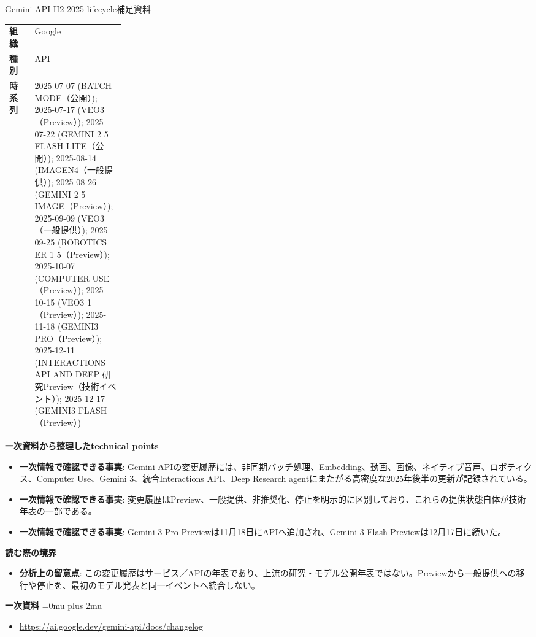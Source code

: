 \begin{technicalnote}{Gemini API H2 2025 lifecycle}{補足資料}
\begingroup
\begin{tabularx}{\linewidth}{@{}>{\bfseries}p{0.22\linewidth}X@{}}
組織 & Google \\
種別 & API \\
時系列 & 2025-07-07 (BATCH MODE（公開）); 2025-07-17 (VEO3（Preview）); 2025-07-22 (GEMINI 2 5 FLASH LITE（公開）); 2025-08-14 (IMAGEN4（一般提供）); 2025-08-26 (GEMINI 2 5 IMAGE（Preview）); 2025-09-09 (VEO3（一般提供）); 2025-09-25 (ROBOTICS ER 1 5（Preview）); 2025-10-07 (COMPUTER USE（Preview）); 2025-10-15 (VEO3 1（Preview）); 2025-11-18 (GEMINI3 PRO（Preview）); 2025-12-11 (INTERACTIONS API AND DEEP 研究Preview（技術イベント）); 2025-12-17 (GEMINI3 FLASH（Preview）) \\
\end{tabularx}
\smallskip
{\bfseries 一次資料から整理したtechnical points}
\begin{itemize}[leftmargin=1.5em,itemsep=0.35em]
\item \textbf{一次情報で確認できる事実}: Gemini APIの変更履歴には、非同期バッチ処理、Embedding、動画、画像、ネイティブ音声、ロボティクス、Computer Use、Gemini 3、統合Interactions API、Deep Research agentにまたがる高密度な2025年後半の更新が記録されている。
\item \textbf{一次情報で確認できる事実}: 変更履歴はPreview、一般提供、非推奨化、停止を明示的に区別しており、これらの提供状態自体が技術年表の一部である。
\item \textbf{一次情報で確認できる事実}: Gemini 3 Pro Previewは11月18日にAPIへ追加され、Gemini 3 Flash Previewは12月17日に続いた。
\end{itemize}
\begin{minipage}{\linewidth}
{\bfseries 読む際の境界}
\begin{itemize}[leftmargin=1.5em,itemsep=0.35em]
\item \textbf{分析上の留意点}: この変更履歴はサービス／APIの年表であり、上流の研究・モデル公開年表ではない。Previewから一般提供への移行や停止を、最初のモデル発表と同一イベントへ統合しない。
\end{itemize}
\begin{samepage}
{\bfseries 一次資料}
\begingroup\sloppy
\Urlmuskip=0mu plus 2mu\relax
\begin{itemize}[leftmargin=1.5em,itemsep=0.25em]
\item {\scriptsize\url{https://ai.google.dev/gemini-api/docs/changelog}}
\end{itemize}
\endgroup
\end{samepage}
\end{minipage}
\endgroup
\end{technicalnote}
\medskip

